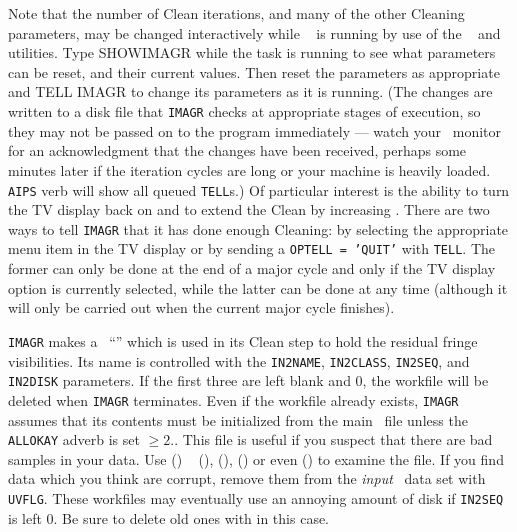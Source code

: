      Note that the number of Clean iterations, and many of the other
Cleaning parameters, may be changed interactively while {\tt
{}} is running by use of the \AIPS\ {\tt {}} and
{\tt {}} utilities.  Type {\us SHOW\qs IMAGR \CR} while the
task is running to see what parameters can be reset, and their current
values.  Then reset the parameters as appropriate and {\us TELL\qs
IMAGR \CR} to change its parameters as it is running.  (The changes
are written to a disk file that {\tt IMAGR} checks at appropriate
stages of execution, so they may not be passed on to the program
immediately --- watch your \AIPS\ monitor for an acknowledgment that
the changes have been received, perhaps some minutes later if the
iteration cycles are long or your machine is heavily loaded.  {\tt
AIPS} verb {\tt {}} will show all queued {\tt TELL}s.)  Of
particular interest is the ability to turn the TV display back on and
to extend the Clean by increasing {\tt {}}\@.  There are two
ways to tell {\tt IMAGR} that it has done enough Cleaning: by
selecting the appropriate menu item in the TV display or by sending a
{\tt OPTELL = 'QUIT'} with {\tt TELL}\@.  The former can only be done
at the end of a major cycle and only if the TV display option is
currently selected, while the latter can be done at any time (although
it will only be carried out when the current major cycle finishes).

     {\tt IMAGR} makes a \uv\ ``'' which is used in its
Clean step to hold the residual fringe visibilities.  Its name is
controlled with the {\tt IN2NAME}, {\tt IN2CLASS}, {\tt IN2SEQ}, and
{\tt IN2DISK} parameters.  If the first three are left blank and 0,
the workfile will be deleted when {\tt IMAGR} terminates.  Even if the
workfile already exists, {\tt IMAGR} assumes that its contents must be
initialized from the main \uv\ file unless the {\tt ALLOKAY} adverb is
set $\ge 2$..  This file is useful if you suspect that there are bad
samples in your data.  Use {\tt {}} () {\tt
{}} (), {\tt {}} (),
{\tt {}} () or even {\tt {}}
() to examine the file.  If you find data which you think
are corrupt, remove them from the {\it input\/} \uv\ data set with
{\tt UVFLG}\@.  These workfiles may eventually use an annoying amount
of disk if {\tt IN2SEQ} is left 0.  Be sure to delete old ones with
{\tt {}} in this case.

